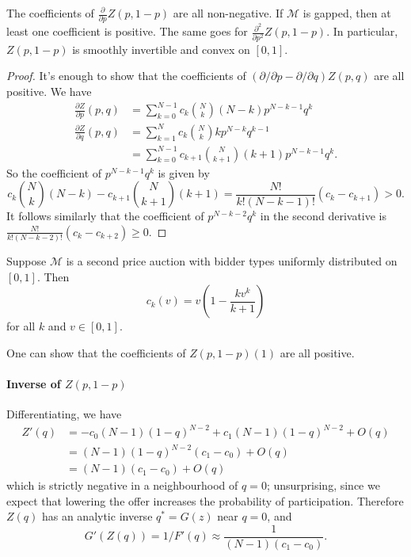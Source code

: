 \begin{lemma}

  The coefficients of $\frac{\partial}{\partial p}Z(p,1-p)$ are all non-negative.
  If $\mathcal{M}$ is gapped, then at least one coefficient is positive.
  The same goes for $\frac{\partial^2}{\partial p^2}Z(p,1-p)$.
  In particular, $Z(p,1-p)$ is smoothly invertible and convex on $[0,1]$.

\end{lemma}
%
\begin{proof}

  It's enough to show that the coefficients of $(\partial/\partial p - \partial/\partial q)Z(p,q)$ are all positive.
  We have
  \begin{align*}
    \frac{\partial Z}{\partial p}(p,q) &= \sum_{k=0}^{N-1} c_k {N \choose k}(N-k)p^{N-k-1}q^k \\
    \frac{\partial Z}{\partial q}(p,q) &= \sum_{k=1}^N c_k {N \choose k}kp^{N-k}q^{k-1} \\
    &= \sum_{k=0}^{N-1} c_{k+1} {N \choose k+1}(k+1) p^{N-k-1}q^{k}.
  \end{align*}
  So the coefficient of $p^{N-k-1}q^k$ is given by
  \[
    c_k {N\choose k}(N-k) - c_{k+1} {N\choose k+1}  (k+1) =  \frac{N!}{k!(N-k-1)!} (c_k-c_{k+1}) > 0. 
  \]
  It follows similarly that the coefficient of $p^{N-k-2}q^k$ in the second derivative is $\frac{N!}{k!(N-k-2)!}(c_k-c_{k+2})\geq 0$.

\end{proof}

\begin{example}

  Suppose $\mathcal{M}$ is a second price auction with bidder types uniformly distributed on $[0,1]$.
  Then 
  \[
    c_k(v) = v \left( 1 - \frac{kv^k}{k+1} \right)
  \]
  for all $k$ and $v\in[0,1]$.
  
  One can show that the coefficients of $Z(p,1-p)(1)$ are all positive.

\end{example}

\paragraph{Inverse of $Z(p,1-p)$}

Differentiating, we have
\begin{align*}
  Z'(q) &= -c_0(N-1)(1-q)^{N-2} + c_1(N-1)(1-q)^{N-2} + O(q) \\
  &= (N-1)(1-q)^{N-2}(c_1-c_0) + O(q) \\
  &= (N-1)(c_1-c_0) + O(q)
\end{align*}
which is strictly negative in a neighbourhood of $q=0$; unsurprising, since we expect that lowering the offer increases the probability of participation.
%
Therefore $Z(q)$ has an analytic inverse $q^*=G(z)$ near $q=0$, and 
\[
  G'(Z(q)) = 1/F'(q) \approx \frac{1}{(N-1)(c_1-c_0)}.
\]

